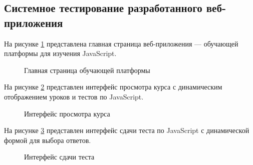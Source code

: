\subsection{Системное тестирование разработанного веб-приложения}

На рисунке \ref{main:image} представлена главная страница веб-приложения — обучающей платформы для изучения JavaScript.

\begin{figure}[H]
	\caption{Главная страница обучающей платформы}
	\label{main:image}
\end{figure}

На рисунке \ref{course:image} представлен интерфейс просмотра курса с динамическим отображением уроков и тестов по JavaScript.

\begin{figure}[ht]
	\caption{Интерфейс просмотра курса}
	\label{course:image}
\end{figure}

На рисунке \ref{test:image} представлен интерфейс сдачи теста по JavaScript с динамической формой для выбора ответов.

\begin{figure}[ht]
	\caption{Интерфейс сдачи теста}
	\label{test:image}
\end{figure}